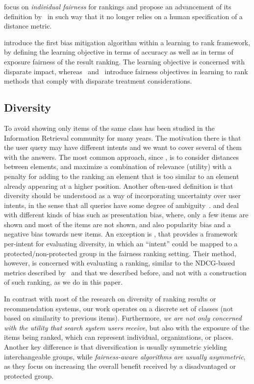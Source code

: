 \citet{lahoti2019operationalizing} focus on \emph{individual fairness} for rankings and propose an advancement of its definition by~\citet{Dwork2012} in such way that it no longer relies on a human specification of a distance metric.

\citet{zehlike2018reducing} introduce the first bias mitigation algorithm within a learning to rank framework, by defining the learning objective in terms of accuracy as well as in terms of exposure fairness of the result ranking.
%
The learning objective is concerned with disparate impact, whereas~\citet{beutel2019fairness} and~\citet{singh2019policy} introduce fairness objectives in learning to rank methods that comply with disparate treatment considerations.

\subsection{Diversity}

To avoid showing only items of the same class has been studied in the Information Retrieval community for many years. The motivation there is that the user query may have different intents and we want to cover several of them with the answers.
%
The most common approach, since \citet{carbonell1998use}, is to consider distances between elements, and maximize a combination of relevance (utility) with a penalty for adding to the ranking an element that is too similar to an element already appearing at a higher position.
%
Another often-used definition is that diversity should be understood as a way of incorporating uncertainty over user intents, in the sense that all queries have some degree of ambiguity~\cite{agrawal2009diversifying}.
%
\citet{kunaver2017diversity} and \citet{channamsetty2017recommender} deal with different kinds of bias such as presentation bias, where, only a few items are shown and most of the items are not shown, and also popularity bias and a negative bias towards new items.
%
An exception is \citet{sakai2011evaluating}, that provides a framework per-intent for evaluating diversity, in which an ``intent'' could be mapped to a protected/non-protected group in the fairness ranking setting. Their method, however, is concerned with evaluating a ranking, similar to the NDCG-based metrics described by~\citet{yang2016measuring} and that we described before, and not with a construction of such ranking, as we do in this paper.

In contrast with most of the research on diversity of ranking results or recommendation systems, our work operates on a discrete set of classes (not based on similarity to previous items).
%
Furthermore, \emph{we are not only concerned with the utility that search system users receive}, but also with the exposure of the items being ranked, which can represent individual, organizations, or places.
%
Another key difference is that diversification is usually symmetric yielding interchangeable groups, while \emph{fairness-aware algorithms are usually asymmetric}, as they focus on increasing the overall benefit received by a disadvantaged or protected group.
